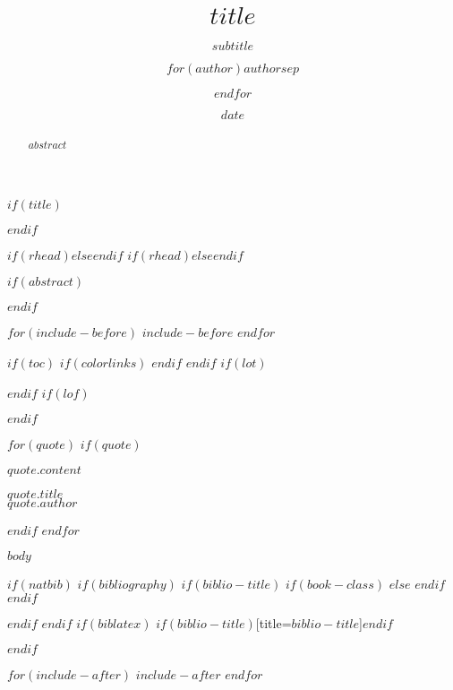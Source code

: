 \documentclass[$if(fontsize)$$fontsize$,$endif$$if(lang)$$babel-lang$,$endif$$if(papersize)$$papersize$paper,$endif$$for(classoption)$$classoption$$sep$,$endfor$nols, notitlepage, notoc]{$documentclass$}
\title{$title$}
\subtitle{$subtitle$}
\author{$for(author)$$author$$sep$ \and $endfor$}
\date{$date$}
\date{}
\begin{document}
$if(title)$
\maketitle
$endif$

\setlength{\epigraphwidth}{1.15\textwidth}


\pagestyle{fancy}
$if(rhead)$$else$\rhead{\footnotesize \thepage\ | \pageref{LastPage}}$endif$
{
  \fancyhf{}
  $if(rhead)$$else$\rhead{\footnotesize \thepage\ | \pageref{LastPage}}$endif$
  \renewcommand{\headrulewidth}{0pt}
}
\thispagestyle{firststyle}



$if(abstract)$
\begin{abstract}
\noindent $abstract$
\end{abstract}
$endif$

$for(include-before)$
$include-before$
$endfor$

$if(toc)$
{
$if(colorlinks)$
\hypersetup{linkcolor=$if(toccolor)$$toccolor$$else$black$endif$}
$endif$
\setcounter{tocdepth}{$toc-depth$}
\tableofcontents
}
$endif$
$if(lot)$
\listoftables
$endif$
$if(lof)$
\listoffigures
$endif$

$for(quote)$
$if(quote)$
\bigskip
\epigraph{$quote.content$}{$quote.title$\\\textsc{$quote.author$}}
\smallskip
$endif$
$endfor$


$body$

$if(natbib)$
$if(bibliography)$
$if(biblio-title)$
$if(book-class)$
\renewcommand\bibname{$biblio-title$}
$else$
\renewcommand\refname{$biblio-title$}
$endif$
$endif$


$endif$
$endif$
$if(biblatex)$
\printbibliography$if(biblio-title)$[title=$biblio-title$]$endif$

$endif$

$for(include-after)$
$include-after$
$endfor$
\end{document}
